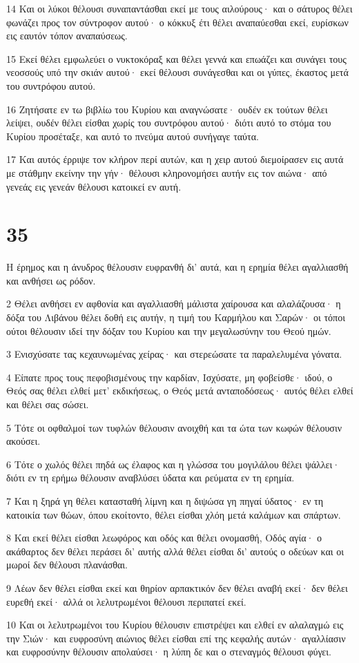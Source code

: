 \par 14 Και οι λύκοι θέλουσι συναπαντάσθαι εκεί με τους αιλούρους· και ο σάτυρος θέλει φωνάζει προς τον σύντροφον αυτού· ο κόκκυξ έτι θέλει αναπαύεσθαι εκεί, ευρίσκων εις εαυτόν τόπον αναπαύσεως.
\par 15 Εκεί θέλει εμφωλεύει ο νυκτοκόραξ και θέλει γεννά και επωάζει και συνάγει τους νεοσσούς υπό την σκιάν αυτού· εκεί θέλουσι συνάγεσθαι και οι γύπες, έκαστος μετά του συντρόφου αυτού.
\par 16 Ζητήσατε εν τω βιβλίω του Κυρίου και αναγνώσατε· ουδέν εκ τούτων θέλει λείψει, ουδέν θέλει είσθαι χωρίς του συντρόφου αυτού· διότι αυτό το στόμα του Κυρίου προσέταξε, και αυτό το πνεύμα αυτού συνήγαγε ταύτα.
\par 17 Και αυτός έρριψε τον κλήρον περί αυτών, και η χειρ αυτού διεμοίρασεν εις αυτά με στάθμην εκείνην την γήν· θέλουσι κληρονομήσει αυτήν εις τον αιώνα· από γενεάς εις γενεάν θέλουσι κατοικεί εν αυτή.

\chapter{35}

\par Η έρημος και η άνυδρος θέλουσιν ευφρανθή δι' αυτά, και η ερημία θέλει αγαλλιασθή και ανθήσει ως ρόδον.
\par 2 Θέλει ανθήσει εν αφθονία και αγαλλιασθή μάλιστα χαίρουσα και αλαλάζουσα· η δόξα του Λιβάνου θέλει δοθή εις αυτήν, η τιμή του Καρμήλου και Σαρών· οι τόποι ούτοι θέλουσιν ιδεί την δόξαν του Κυρίου και την μεγαλωσύνην του Θεού ημών.
\par 3 Ενισχύσατε τας κεχαυνωμένας χείρας· και στερεώσατε τα παραλελυμένα γόνατα.
\par 4 Είπατε προς τους πεφοβισμένους την καρδίαν, Ισχύσατε, μη φοβείσθε· ιδού, ο Θεός σας θέλει ελθεί μετ' εκδικήσεως, ο Θεός μετά ανταποδόσεως· αυτός θέλει ελθεί και θέλει σας σώσει.
\par 5 Τότε οι οφθαλμοί των τυφλών θέλουσιν ανοιχθή και τα ώτα των κωφών θέλουσιν ακούσει.
\par 6 Τότε ο χωλός θέλει πηδά ως έλαφος και η γλώσσα του μογιλάλου θέλει ψάλλει· διότι εν τη ερήμω θέλουσιν αναβλύσει ύδατα και ρεύματα εν τη ερημία.
\par 7 Και η ξηρά γη θέλει κατασταθή λίμνη και η διψώσα γη πηγαί ύδατος· εν τη κατοικία των θώων, όπου εκοίτοντο, θέλει είσθαι χλόη μετά καλάμων και σπάρτων.
\par 8 Και εκεί θέλει είσθαι λεωφόρος και οδός και θέλει ονομασθή, Οδός αγία· ο ακάθαρτος δεν θέλει περάσει δι' αυτής αλλά θέλει είσθαι δι' αυτούς ο οδεύων και οι μωροί δεν θέλουσι πλανάσθαι.
\par 9 Λέων δεν θέλει είσθαι εκεί και θηρίον αρπακτικόν δεν θέλει αναβή εκεί· δεν θέλει ευρεθή εκεί· αλλά οι λελυτρωμένοι θέλουσι περιπατεί εκεί.
\par 10 Και οι λελυτρωμένοι του Κυρίου θέλουσιν επιστρέψει και ελθεί εν αλαλαγμώ εις την Σιών· και ευφροσύνη αιώνιος θέλει είσθαι επί της κεφαλής αυτών· αγαλλίασιν και ευφροσύνην θέλουσιν απολαύσει· η λύπη δε και ο στεναγμός θέλουσι φύγει.

